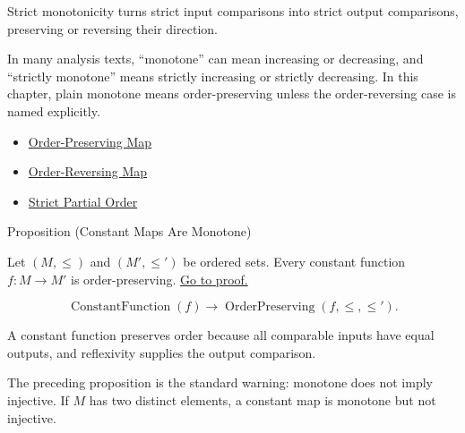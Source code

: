 \begin{remark*}[Interpretation]
Strict monotonicity turns strict input comparisons into strict output
comparisons, preserving or reversing their direction.
\end{remark*}

\begin{remark*}[Exposition]
In many analysis texts, ``monotone'' can mean increasing or decreasing, and
``strictly monotone'' means strictly increasing or strictly decreasing. In this
chapter, plain monotone means order-preserving unless the order-reversing case
is named explicitly.
\end{remark*}

\begin{dependencies}
\begin{itemize}
  \item \hyperref[def:order-preserving-map-ordered-sets]{Order-Preserving Map}
  \item \hyperref[def:order-reversing-map]{Order-Reversing Map}
  \item \hyperref[def:strict-partial-order-relations]{Strict Partial Order}
\end{itemize}
\end{dependencies}

\begin{propositionbox}{Proposition (Constant Maps Are Monotone)}
\begin{proposition}\label{prop:constant-maps-monotone}
Let $(M,\leq)$ and $(M',\leq')$ be ordered sets. Every constant function
$f:M\to M'$ is order-preserving.
\hyperref[prf:constant-maps-monotone]{Go to proof.}
\end{proposition}
\end{propositionbox}

\begin{remark*}
\[
  \operatorname{ConstantFunction}(f)
  \to
  \operatorname{OrderPreserving}(f,\leq,\leq').
\]
\end{remark*}

\begin{remark*}[Interpretation]
A constant function preserves order because all comparable inputs have equal
outputs, and reflexivity supplies the output comparison.
\end{remark*}

\begin{remark*}[Exposition]
The preceding proposition is the standard warning: monotone does not imply
injective. If $M$ has two distinct elements, a constant map is monotone but
not injective.
\end{remark*}

